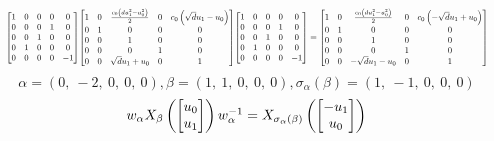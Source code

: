 \documentclass[11pt]{article}
\theoremstyle{definition}
\begin{document}
\[
\scaletoalign{\textwidth}{{\left[\begin{matrix}1 & 0 & 0 & 0 & 0\\0 & 0 & 0 & 1 & 0\\0 & 0 & 1 & 0 & 0\\0 & 1 & 0 & 0 & 0\\0 & 0 & 0 & 0 & -1\end{matrix}\right]} {\left[\begin{matrix}1 & 0 & \frac{c_{0} \left(d u_{1}^{2} - u_{0}^{2}\right)}{2} & 0 & c_{0} \left(\sqrt{d} u_{1} - u_{0}\right)\\0 & 1 & 0 & 0 & 0\\0 & 0 & 1 & 0 & 0\\0 & 0 & 0 & 1 & 0\\0 & 0 & \sqrt{d} u_{1} + u_{0} & 0 & 1\end{matrix}\right]} {\left[\begin{matrix}1 & 0 & 0 & 0 & 0\\0 & 0 & 0 & 1 & 0\\0 & 0 & 1 & 0 & 0\\0 & 1 & 0 & 0 & 0\\0 & 0 & 0 & 0 & -1\end{matrix}\right]} = {\left[\begin{matrix}1 & 0 & \frac{c_{0} \left(d u_{1}^{2} - u_{0}^{2}\right)}{2} & 0 & c_{0} \left(- \sqrt{d} u_{1} + u_{0}\right)\\0 & 1 & 0 & 0 & 0\\0 & 0 & 1 & 0 & 0\\0 & 0 & 0 & 1 & 0\\0 & 0 & - \sqrt{d} u_{1} - u_{0} & 0 & 1\end{matrix}\right]}}
\]
\[
\alpha = \left( 0, \  -2, \  0, \  0, \  0\right), \beta = \left( 1, \  1, \  0, \  0, \  0\right), \sigma_{\alpha}(\beta) = \left( 1, \  -1, \  0, \  0, \  0\right)
\]
\[
\scaletoalign{\textwidth}{w_{\alpha} X_{\beta}\left(\left[\begin{matrix}u_{0}\\u_{1}\end{matrix}\right]\right) w_{\alpha}^{-1} = X_{\sigma_{\alpha}\left(\beta\right)}\left(\left[\begin{matrix}- u_{1}\\u_{0}\end{matrix}\right]\right)}
\]
\end{document}
